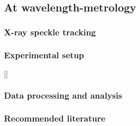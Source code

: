 \begin{refsection}
\subsection{At wavelength-metrology}

\subsubsection*{X-ray speckle tracking}


\subsubsection*{Experimental setup}


[\cite{Berujon2020a, Berujon2020}]


\subsubsection*{Data processing and analysis}

\subsubsection*{Recommended literature}


\end{refsection}
